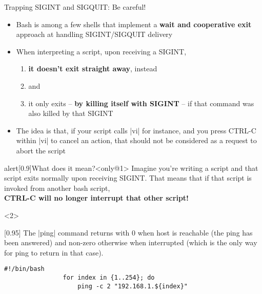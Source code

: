 \begin{frame}[fragile]{Trapping SIGINT and SIGQUIT: Be careful!}
    \vspace{-3mm}
    \begin{overlayarea}{\textwidth}{0.7\textheight}
        \begin{itemize}
            \item Bash is among a few shells that implement a \textbf{wait and cooperative exit} approach at handling SIGINT/SIGQUIT delivery
            \item When interpreting a script, upon receiving a SIGINT,
            \begin{enumerate}
                \item \textbf{it doesn't exit straight away}, instead
                \item {} and
                \item \alert{it only exits -- \textbf{by killing itself with SIGINT} -- if that command was also killed by that SIGINT}
            \end{enumerate}
            \item<only@1> The idea is that, if your script calls \bash|vi| for instance, and you press CTRL-C within \bash|vi| to cancel an action, that should not be considered as a request to abort the script
        \end{itemize}
        \begin{varblock}{alert}[0.9\textwidth]{What does it mean?}<only@1>
            Imagine you're writing a script and that script exits normally upon receiving SIGINT.
            That means that if that script is invoked from another bash script, \\\alert{\textbf{CTRL-C will no longer interrupt that other script!}}
        \end{varblock}
        \begin{onlyenv}<2>
            \begin{varblock}{}[0.95\textwidth]{}
                \small The \bash|ping| command returns with 0 when host is reachable (the ping has been answered) and non-zero otherwise when interrupted (which is the only way for ping to return in that case).
            \end{varblock}
            \begin{lstlisting}[style=MyBash, belowskip=-5mm]
                #!/bin/bash
                for index in {1..254}; do
                    ping -c 2 "192.168.1.${index}"

\end{lstlisting}
\end{onlyenv}
\end{overlayarea}
\end{frame}
